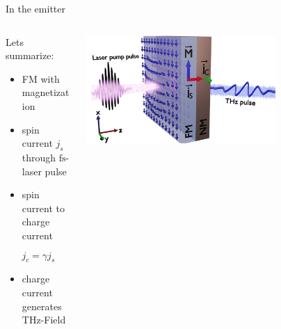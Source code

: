 \documentclass[aspectratio=1610, 9pt]{beamer}
\begin{document}
\begin{frame}{In the emitter}
  \begin{columns}
    \begin{column}{.3\textwidth}
      \Large Lets summarize:
      \normalsize
      \vspace{0.3in}
      \begin{itemize}
        \item FM with magnetization
        \vspace{0.2in}
        \item spin current $j_s$ through $\si{\femto\second}$-laser pulse
        \vspace{0.2in}
        \item spin current to charge current
      \end{itemize}
      \vspace{0.2in}
      \begin{equation*}
        j_c = γj_s
      \end{equation*}
      \begin{itemize}
        \item charge current generates THz-Field
      \end{itemize}
    \end{column}
    \begin{column}{.7\textwidth}
      \begin{center}
        \includegraphics[width=0.7\textwidth]{pics/emitter.png}
      \end{center}
    \end{column}
  \end{columns}
\end{frame}
\end{document}
